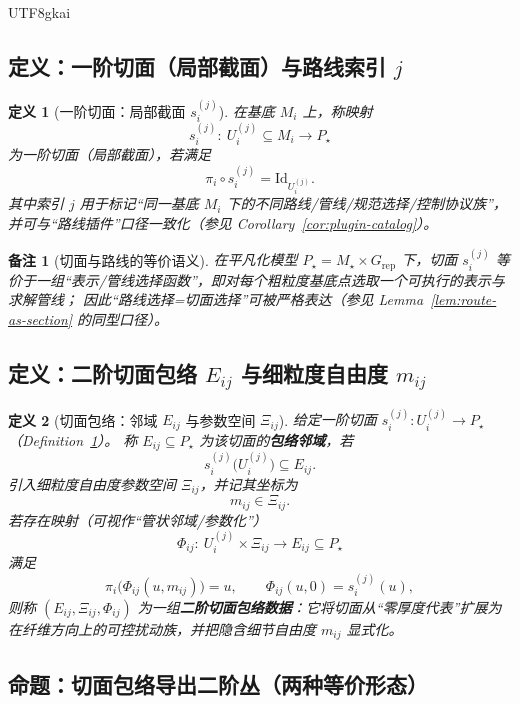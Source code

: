 \documentclass[12pt]{article}
\newtheorem{definition}{定义}[section]
\newtheorem{remark}{备注}[section]
\begin{document}
\begin{CJK*}{UTF8}{gkai}
\subsection{定义：一阶切面（局部截面）与路线索引 $j$}

\begin{definition}[一阶切面：局部截面 $s_i^{(j)}$]
\label{def:first-order-sections}
在基底 $M_i$ 上，称映射
\[
s_i^{(j)}:\ U_i^{(j)}\subseteq M_i\to P_\star
\]
为一阶切面（局部截面），若满足
\[
\pi_i\circ s_i^{(j)}=\mathrm{Id}_{U_i^{(j)}}.
\]
其中索引 $j$ 用于标记“同一基底 $M_i$ 下的不同路线/管线/规范选择/控制协议族”，并可与“路线插件”口径一致化（参见 Corollary~\ref{cor:plugin-catalog}）。
\end{definition}

\begin{remark}[切面与路线的等价语义]
在平凡化模型 $P_\star=M_\star\times G_{\mathrm{rep}}$ 下，切面 $s_i^{(j)}$ 等价于一组“表示/管线选择函数”，即对每个粗粒度基底点选取一个可执行的表示与求解管线；
因此“路线选择=切面选择”可被严格表达（参见 Lemma~\ref{lem:route-as-section} 的同型口径）。
\end{remark}

\subsection{定义：二阶切面包络 $E_{ij}$ 与细粒度自由度 $m_{ij}$}

\begin{definition}[切面包络：邻域 $E_{ij}$ 与参数空间 $\Xi_{ij}$]
\label{def:section-envelope}
给定一阶切面 $s_i^{(j)}:U_i^{(j)}\to P_\star$（Definition~\ref{def:first-order-sections}）。
称 $E_{ij}\subseteq P_\star$ 为该切面的\textbf{包络邻域}，若
\[
s_i^{(j)}\bigl(U_i^{(j)}\bigr)\subseteq E_{ij}.
\]
引入细粒度自由度参数空间 $\Xi_{ij}$，并记其坐标为
\[
m_{ij}\in \Xi_{ij}.
\]
若存在映射（可视作“管状邻域/参数化”）
\[
\Phi_{ij}:\ U_i^{(j)}\times \Xi_{ij}\to E_{ij}\subseteq P_\star
\]
满足
\[
\pi_i\bigl(\Phi_{ij}(u,m_{ij})\bigr)=u,
\qquad
\Phi_{ij}(u,0)=s_i^{(j)}(u),
\]
则称 $(E_{ij},\Xi_{ij},\Phi_{ij})$ 为一组\textbf{二阶切面包络数据}：它将切面从“零厚度代表”扩展为在纤维方向上的可控扰动族，并把隐含细节自由度 $m_{ij}$ 显式化。
\end{definition}

\subsection{命题：切面包络导出二阶丛（两种等价形态）}


\end{CJK*}
\end{document}
